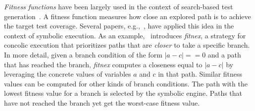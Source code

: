 {\em Fitness functions} have been largely used in the context of search-based test generation~\cite{M-STVR04}. %
A fitness function measures how close an explored path is to achieve the target test coverage. Several papers, e.g.,~\cite{XTD-DSN09,CS-CACM13,XTD-DSN09}, have applied this idea in the context of symbolic execution. As an example,~\cite{XTD-DSN09} introduces {\em fitnex}, a strategy for concolic execution that prioritizes paths that are {\em closer} to take a specific branch. In more detail, given a branch condition of the form $|a - c| == 0$ and a path that has reached the branch, {\em fitnex} computes a closeness equal to $|a - c|$ by leveraging the concrete values of variables $a$ and $c$ in that path. Similar fitness values can be computed for other kinds of branch conditions. The path with the lowest fitness value for a branch is selected by the symbolic engine. Paths that have not reached the branch yet get the worst-case fitness value.

